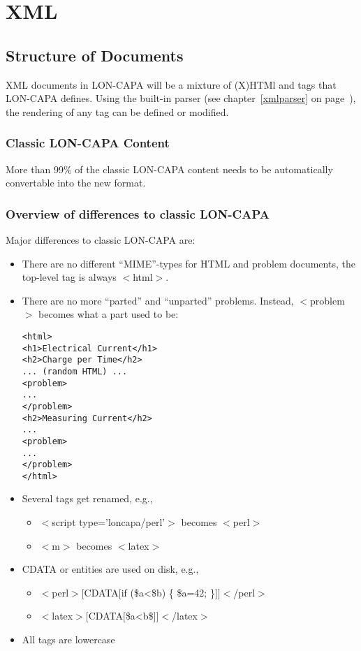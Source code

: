 \chapter{XML}
\section{Structure of Documents}
XML documents in LON-CAPA will be a mixture of (X)HTMl and tags that LON-CAPA defines. Using the built-in parser (see chapter~\ref{xmlparser} on page~\pageref{xmlparser}), the rendering of any tag can be defined or modified.
\subsection{Classic LON-CAPA Content}
More than 99\% of the classic LON-CAPA content needs to be automatically convertable into the new format.
\subsection{Overview of differences to classic LON-CAPA}
Major differences to classic LON-CAPA are:
\begin{itemize}
\item There are no different ``MIME''-types for HTML and problem documents, the top-level tag is always $<$html$>$.
\item There are no more ``parted'' and ``unparted'' problems. Instead, $<$problem$>$ becomes what a part used to be:
\begin{verbatim}
<html>
<h1>Electrical Current</h1>
<h2>Charge per Time</h2>
... (random HTML) ...
<problem>
...
</problem>
<h2>Measuring Current</h2>
...
<problem>
...
</problem>
</html>
\end{verbatim}
\item Several tags get renamed, e.g.,
\begin{itemize}
\item $<$script type='loncapa/perl'$>$ becomes $<$perl$>$
\item $<$m$>$ becomes $<$latex$>$
\end{itemize}
\item CDATA or entities are used on disk, e.g.,
\begin{itemize}
\item $<$perl$>[$CDATA$[$if (\$a<\$b) \{ \$a=42; \}$]]<$/perl$>$
\item $<$latex$>[$CDATA$[$\$a<b\$$]]<$/latex$>$
\end{itemize}
\item All tags are lowercase
\end{itemize}
